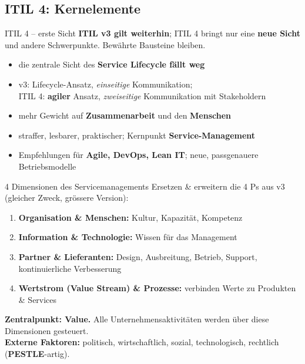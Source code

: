 \documentclass[a4paper, fontsize=7pt]{scrartcl}
\begin{document}
\subsection{ITIL 4: Kernelemente}

\begin{mainbox}{ITIL 4 -- erste Sicht}
\textbf{ITIL v3 gilt weiterhin}; ITIL 4 bringt nur eine \textbf{neue Sicht}
und andere Schwerpunkte. Bewährte Bausteine bleiben.
\begin{itemize}
    \item die zentrale Sicht des \textbf{Service Lifecycle fällt weg}
    \item v3: Lifecycle-Ansatz, \emph{einseitige} Kommunikation;\\
          ITIL 4: \textbf{agiler} Ansatz, \emph{zweiseitige} Kommunikation
          mit Stakeholdern
    \item mehr Gewicht auf \textbf{Zusammenarbeit} und den
          \textbf{Menschen}
    \item straffer, lesbarer, praktischer; Kernpunkt
          \textbf{Service-Management}
    \item Empfehlungen für \textbf{Agile, DevOps, Lean IT}; neue,
          passgenauere Betriebsmodelle
\end{itemize}
\end{mainbox}

\begin{mainbox}{4 Dimensionen des Servicemanagements}
Ersetzen \& erweitern die 4 Ps aus v3 (gleicher Zweck, grössere Version):
\begin{enumerate}
    \item \textbf{Organisation \& Menschen:} Kultur, Kapazität, Kompetenz
    \item \textbf{Information \& Technologie:} Wissen für das Management
    \item \textbf{Partner \& Lieferanten:} Design, Ausbreitung, Betrieb,
          Support, kontinuierliche Verbesserung
    \item \textbf{Wertstrom (Value Stream) \& Prozesse:} verbinden Werte zu
          Produkten \& Services
\end{enumerate}
\textbf{Zentralpunkt: Value.} Alle Unternehmensaktivitäten werden über diese
Dimensionen gesteuert.\\
\textbf{Externe Faktoren:} politisch, wirtschaftlich, sozial, technologisch,
rechtlich (\textbf{PESTLE}-artig).
\end{mainbox}
\end{document}
